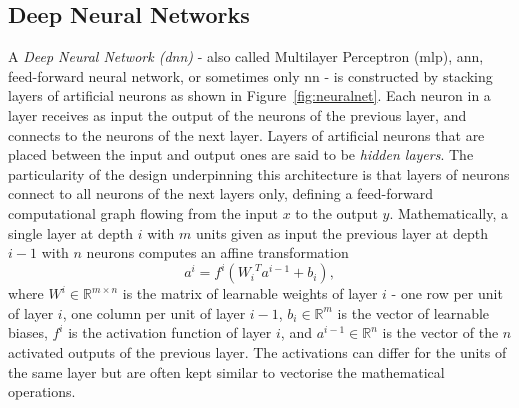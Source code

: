 \subsection{Deep Neural Networks}
A \textit{Deep Neural Network (\gls{dnn})} - also called Multilayer Perceptron (\gls{mlp}), \gls{ann}, feed-forward neural network, or sometimes only \gls{nn} - is constructed by stacking layers of artificial neurons as shown in Figure~\ref{fig:neuralnet}. Each neuron in a layer receives as input the output of the neurons of the previous layer, and connects to the neurons of the next layer. Layers of artificial neurons that are placed between the input and output ones are said to be \textit{hidden layers}. The particularity of the design underpinning this architecture is that layers of neurons connect to all neurons of the next layers only, defining a feed-forward computational graph flowing from the input $x$ to the output $y$. Mathematically, a single layer at depth $i$ with $m$ units given as input the previous layer at depth $i-1$ with $n$ neurons computes an affine transformation
\begin{equation}\label{eq:feedforward}
    a^i = f^i\left({W_i}^T a^{i-1} + b_i\right),
\end{equation}
where $W^i \in \mathbb{R}^{m \times n}$ is the matrix of learnable weights of layer $i$ - one row per unit of layer $i$, one column per unit of layer $i-1$, $b_i \in \mathbb{R}^m$ is the vector of learnable biases, $f^i$ is the activation function of layer $i$, and $a^{i-1} \in \mathbb{R}^n$ is the vector of the $n$ activated outputs of the previous layer. The activations can differ for the units of the same layer but are often kept similar to vectorise the mathematical operations. 

